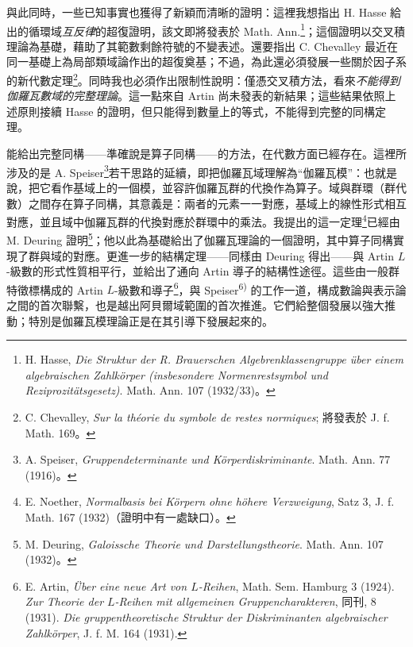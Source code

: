 \documentclass[11pt]{article}
\begin{document}
與此同時，一些已知事實也獲得了新穎而清晰的證明：這裡我想指出 H. Hasse 給出的循環域\emph{互反律}的超復證明，該文即將發表於 Math. Ann.\footnote{H. Hasse, \emph{Die Struktur der R. Brauerschen Algebrenklassengruppe über einem algebraischen Zahlkörper (insbesondere Normenrestsymbol und Reziprozitätsgesetz)}. Math. Ann. 107 (1932/33)。}；這個證明以交叉積理論為基礎，藉助了其範數剩餘符號的不變表述。還要指出 C. Chevalley 最近在同一基礎上為局部類域論作出的超復奠基；不過，為此還必須發展一些關於因子系的新代數定理\footnote{C. Chevalley, \emph{Sur la théorie du symbole de restes normiques}; 將發表於 J. f. Math. 169。}。同時我也必須作出限制性說明：僅憑交叉積方法，看來\emph{不能得到伽羅瓦數域的完整理論}。這一點來自 Artin 尚未發表的新結果；這些結果依照上述原則接續 Hasse 的證明，但只能得到數量上的等式，不能得到完整的同構定理。

能給出完整同構——準確說是算子同構——的方法，在代數方面已經存在。這裡所涉及的是 A. Speiser\footnote{A. Speiser, \emph{Gruppendeterminante und Körperdiskriminante}. Math. Ann. 77 (1916)。}若干思路的延續，即把伽羅瓦域理解為“伽羅瓦模”：也就是說，把它看作基域上的一個模，並容許伽羅瓦群的代換作為算子。域與群環（群代數）之間存在算子同構，其意義是：兩者的元素一一對應，基域上的線性形式相互對應，並且域中伽羅瓦群的代換對應於群環中的乘法。我提出的這一定理\footnote{E. Noether, \emph{Normalbasis bei Körpern ohne höhere Verzweigung}, Satz 3, J. f. Math. 167 (1932)（證明中有一處缺口）。}已經由 M. Deuring 證明\footnote{M. Deuring, \emph{Galoissche Theorie und Darstellungstheorie}. Math. Ann. 107 (1932)。}；他以此為基礎給出了伽羅瓦理論的一個證明，其中算子同構實現了群與域的對應。更進一步的結構定理——同樣由 Deuring 得出——與 Artin \(L\)-級數的形式性質相平行，並給出了通向 Artin 導子的結構性途徑。這些由一般群特徵標構成的 Artin \(L\)-級數和導子\footnote{E. Artin, \emph{Über eine neue Art von \(L\)-Reihen}, Math. Sem. Hamburg 3 (1924). \emph{Zur Theorie der \(L\)-Reihen mit allgemeinen Gruppencharakteren}, 同刊, 8 (1931). \emph{Die gruppentheoretische Struktur der Diskriminanten algebraischer Zahlkörper}, J. f. M. 164 (1931).}，與 Speiser\textsuperscript{6)} 的工作一道，構成數論與表示論之間的首次聯繫，也是越出阿貝爾域範圍的首次推進。它們給整個發展以強大推動；特別是伽羅瓦模理論正是在其引導下發展起來的。
\end{document}
